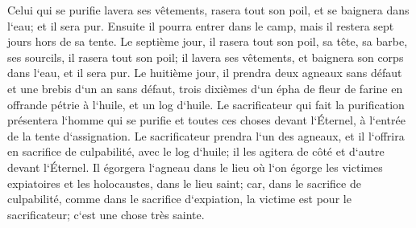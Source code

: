 \verse Celui qui se purifie lavera ses vêtements, rasera tout son poil, et se baignera dans l`eau; et il sera pur. Ensuite il pourra entrer dans le camp, mais il restera sept jours hors de sa tente. 
\verse Le septième jour, il rasera tout son poil, sa tête, sa barbe, ses sourcils, il rasera tout son poil; il lavera ses vêtements, et baignera son corps dans l`eau, et il sera pur. 
\verse Le huitième jour, il prendra deux agneaux sans défaut et une brebis d`un an sans défaut, trois dixièmes d`un épha de fleur de farine en offrande pétrie à l`huile, et un log d`huile. 
\verse Le sacrificateur qui fait la purification présentera l`homme qui se purifie et toutes ces choses devant l`Éternel, à l`entrée de la tente d`assignation. 
\verse Le sacrificateur prendra l`un des agneaux, et il l`offrira en sacrifice de culpabilité, avec le log d`huile; il les agitera de côté et d`autre devant l`Éternel. 
\verse Il égorgera l`agneau dans le lieu où l`on égorge les victimes expiatoires et les holocaustes, dans le lieu saint; car, dans le sacrifice de culpabilité, comme dans le sacrifice d`expiation, la victime est pour le sacrificateur; c`est une chose très sainte. 
